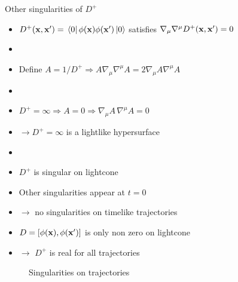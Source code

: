 \documentclass{beamer}
\begin{document}
\begin{frame}{Other singularities of \(D^+\)}
\begin{itemize}
	\item \(D^+(\vb{x},\vb{x}') = \bra*{0}\phi(\vb{x})\phi(\vb{x}')\ket*{0}\) satisfies \(\nabla_\mu\nabla^\mu D^+(\vb{x},\vb{x}') = 0\)
	\item[]
	\item Define \(A = 1/D^+ \Rightarrow A \nabla_\mu\nabla^\mu A = 2 \nabla_\mu A \nabla^\mu A\)
	\item[]	
	\item \(D^+ = \infty \Rightarrow A = 0 \Rightarrow \nabla_\mu A\,\nabla^\mu A = 0\)
	\item[] \(\to D^+ = \infty\) is a lightlike hypersurface
	\item[]	
	\item \(D^+\) is singular on lightcone
\end{itemize}
\end{frame}
\begin{frame}
\begin{itemize}
	\item Other singularities appear at \(t = 0\) 
	\item[] \(\to\) no singularities on timelike trajectories 
	\item \(D = [\phi(\vb{x}),\phi(\vb{x}')]\) is only non zero on lightcone
	\item[] \(\to\) \(D^+\) is real for all trajectories 
\end{itemize}
\begin{figure}
\centering
{}
\caption{Singularities on trajectories}
\end{figure}
\end{frame}
\end{document}
